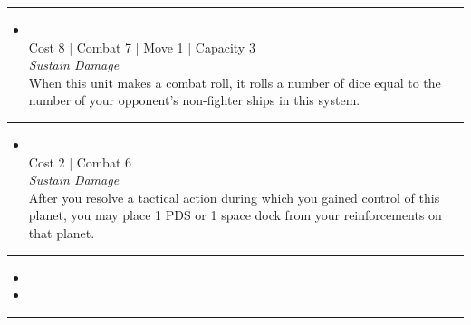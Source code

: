\begin{multicols}{2}
\vspace{-10pt}\rule{\hsize}{0.4pt}\vspace{5pt}


\begin{itemize}
\item {}\\
Cost 8 | Combat 7 | Move 1 | Capacity 3 \\
\emph{Sustain Damage}\\
When this unit makes a combat roll, it rolls a number of dice equal to the number of your opponent's non-fighter ships in this system.
\end{itemize}

\vspace{-10pt}\rule{\hsize}{0.4pt}\vspace{5pt}


\begin{itemize}
\item {}
\\
Cost 2 | Combat 6 \\
\emph{Sustain Damage}\\
After you resolve a tactical action during which you gained control of this planet, you may place 1 PDS or 1 space dock from your reinforcements on that planet. 
\end{itemize}

\vspace{-10pt}\rule{\hsize}{0.4pt}\vspace{5pt}

\nounits

\columnbreak
{}

\begin{itemize}
\item \gateFolding
\item \hegemonic
\end{itemize}

\vspace{-10pt}\rule{\hsize}{0.4pt}\vspace{5pt}



\end{multicols}

